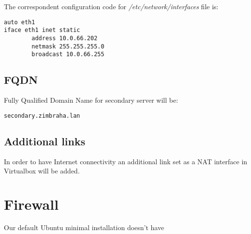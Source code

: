 The correspondent configuration code for \textit{/etc/network/interfaces} file is:
\begin{verbatim}
auto eth1
iface eth1 inet static
        address 10.0.66.202
        netmask 255.255.255.0
        broadcast 10.0.66.255
\end{verbatim}
\subsection {FQDN}
Fully Qualified Domain Name for secondary server will be:
\begin{verbatim}
secondary.zimbraha.lan
\end{verbatim}
\subsection {Additional links}
In order to have Internet connectivity an additional link set as a NAT interface in Virtualbox will be added.

\section {Firewall}
Our default Ubuntu minimal installation doesn't have 
